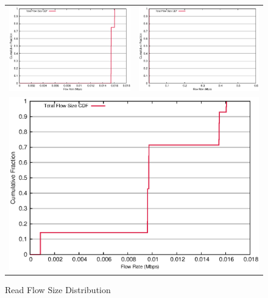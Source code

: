 \begin{figure}[!ht]
\label{fig:read_size}
\centering	
    \begin{tabular}{@{}cc@{}}
	\includegraphics[width=.55\textwidth]{figures/4read/24_28_flow_size.eps} &
	\includegraphics[width=.55\textwidth]{figures/4read/8_12_flow_size.eps}  \\
	\multicolumn{2}{c}{\includegraphics[width=.73\textwidth]{figures/4read/flow_size.eps}}
     \end{tabular}
\caption{Read Flow Size Distribution}
\end{figure}

